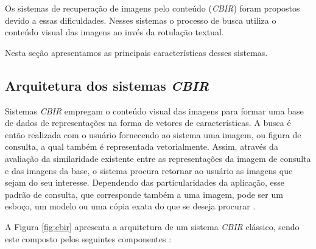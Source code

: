 Os sistemas de recuperação de imagens pelo conteúdo (\emph{CBIR}) foram propostos devido a essas dificuldades. Nesses sistemas o processo de busca utiliza o conteúdo visual das imagens ao invés da rotulação textual. 

Nesta seção apresentamos as principais características desses sistemas.

\subsection{Arquitetura dos sistemas \emph{CBIR}}

Sistemas \emph{CBIR} empregam o conteúdo visual das imagens para formar uma base de dados de representações na forma de vetores de características. A busca é então realizada com o usuário fornecendo ao sistema uma imagem, ou figura de consulta, a qual também é representada vetorialmente. Assim, através da avaliação da similaridade existente entre as representações da imagem de consulta e das imagens da base, o sistema procura retornar ao usuário as imagens que sejam do seu interesse. Dependendo das particularidades da aplicação, esse padrão de consulta, que corresponde também a uma imagem, pode ser um esboço, um modelo ou uma cópia exata do que se deseja procurar \cite{Smeulders:2000}.

\begin{comment}
Sistemas \emph{CBIR} realizam buscas em bases multimídia utilizando o conteúdo visual das imagens, visando recuperar imagens que sejam do interesse do usuário mediante um padrão de consulta especificado. O campo das pesquisas em recuperação de imagens pelo conteúdo é vasto e relativamente recente.
\end{comment}


A Figura \ref{fig:cbir} apresenta a arquitetura de um sistema \emph{CBIR} clássico, sendo este composto pelos seguintes componentes \cite{Torres:2006}:

